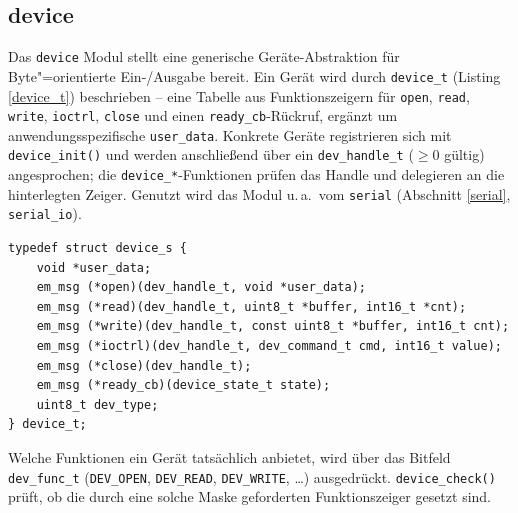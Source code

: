 \subsection{device}\label{device}
Das \verb|device| Modul stellt eine generische Geräte-Abstraktion für
Byte"=orientierte Ein-/Ausgabe bereit. Ein Gerät wird durch \verb|device_t|
(Listing \ref{device_t}) beschrieben -- eine Tabelle aus Funktionszeigern
für \verb|open|, \verb|read|, \verb|write|, \verb|ioctrl|, \verb|close| und
einen \verb|ready_cb|-Rückruf, ergänzt um anwendungsspezifische
\verb|user_data|. Konkrete Geräte registrieren sich mit \verb|device_init()|
und werden anschließend über ein \verb|dev_handle_t| ($\ge 0$ gültig)
angesprochen; die \verb|device_*|-Funktionen prüfen das Handle und delegieren
an die hinterlegten Zeiger. Genutzt wird das Modul u.\,a.\ vom \verb|serial|
(Abschnitt \ref{serial}, \verb|serial_io|).

\begin{listing}
\begin{verbatim}
typedef struct device_s {
    void *user_data;
    em_msg (*open)(dev_handle_t, void *user_data);
    em_msg (*read)(dev_handle_t, uint8_t *buffer, int16_t *cnt);
    em_msg (*write)(dev_handle_t, const uint8_t *buffer, int16_t cnt);
    em_msg (*ioctrl)(dev_handle_t, dev_command_t cmd, int16_t value);
    em_msg (*close)(dev_handle_t);
    em_msg (*ready_cb)(device_state_t state);
    uint8_t dev_type;
} device_t;
\end{verbatim}
\caption{Geräte-Schnittstelle \texttt{device\_t}}
\label{device_t}
\end{listing}

\noindent Welche Funktionen ein Gerät tatsächlich anbietet, wird über das
Bitfeld \verb|dev_func_t| (\verb|DEV_OPEN|, \verb|DEV_READ|, \verb|DEV_WRITE|,
\dots) ausgedrückt. \verb|device_check()| prüft, ob die durch eine solche
Maske geforderten Funktionszeiger gesetzt sind.

